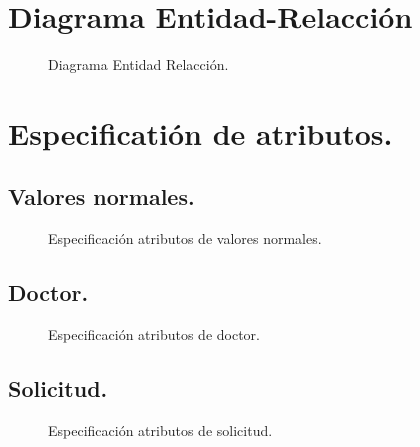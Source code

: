 \documentclass[a4paper,10pt]{article}
\begin{document}
\pagebreak

\section{Diagrama Entidad-Relacción}
\begin{center}
	\begin{figure}[hbt]
		\begin{center}
			\scalebox{.6}{
				\hspace{-1.7cm}
				
			}
		\end{center}
		\caption{Diagrama Entidad Relacción.}
		\label{fig:diagramaER}
	\end{figure}
\end{center}



\pagebreak

\section{Especificatión de atributos.}
\subsection{Valores normales.}
\begin{figure}[hbt]
	\begin{center}
		\scalebox{0.5}{}
	\end{center}
	\caption{Especificación atributos de valores normales.}
	\label{fig:spec_valores_normales}
\end{figure}
\subsection{Doctor.}
\begin{figure}[hbt]
	\begin{center}
		\scalebox{0.5}{}
	\end{center}
	\caption{Especificación atributos de doctor.}
	\label{fig:spec_doctor}
\end{figure}
\subsection{Solicitud.}
\begin{figure}[hbt]
	\begin{center}
		\scalebox{0.5}{}
	\end{center}
	\caption{Especificación atributos de solicitud.}
	\label{fig:spec_solicitud}
\end{figure}
\pagebreak
\end{document}
